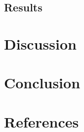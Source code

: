 \documentclass[cm]{glossa}
\begin{document}
\hypertarget{results-1}{%
\subsection{Results}\label{results-1}}

\hypertarget{discussion}{%
\section{Discussion}\label{discussion}}

\hypertarget{conclusion}{%
\section{Conclusion}\label{conclusion}}

\hypertarget{sec:refs}{%
\section*{References}\label{sec:refs}}


\end{document}
